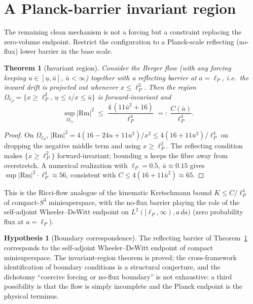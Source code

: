 \documentclass[aps,prd,twocolumn,superscriptaddress,nofootinbib,floatfix]{revtex4-2}
\theoremstyle{plain}
\newtheorem{theorem}{Theorem}
\theoremstyle{definition}
\newtheorem{hypothesis}{Hypothesis}
\newcommand{\Rm}{\mathrm{Rm}}
\newcommand{\lP}{\ell_P}
\begin{document}
\section{A Planck-barrier invariant region}\label{sec:barrier}

The remaining clean mechanism is not a forcing but a constraint replacing the zero-volume endpoint. Restrict the configuration to a Planck-scale reflecting (no-flux) lower barrier in the base scale.

\begin{theorem}[Invariant region]\label{thm:barrier}
Consider the Berger flow (with any forcing keeping $u\in[\underline u,\bar u]$, $\bar u<\infty$) together with a reflecting barrier at $a=\lP$, i.e.\ the inward drift is projected out whenever $x\le\lP^2$. Then the region $\Omega_{\lP}=\{x\ge\lP^2,\ \underline u\le z/x\le\bar u\}$ is forward-invariant and
\begin{equation}\label{eq:bound}
\sup_{\Omega_{\lP}}|\Rm|^2 \;\le\; \frac{4\,(11\bar u^2+16)}{\lP^4}\;=:\;\frac{C(\bar u)}{\lP^4}.
\end{equation}
\end{theorem}

\begin{proof}
On $\Omega_{\lP}$, $|\Rm|^2=4(16-24u+11u^2)/x^2\le 4(16+11\bar u^2)/\lP^4$ on dropping the negative middle term and using $x\ge\lP^2$. The reflecting condition makes $\{x\ge\lP^2\}$ forward-invariant; bounding $u$ keeps the fibre away from overstretch. A numerical realization with $\lP=0.5$, $\bar u\approx0.15$ gives $\sup|\Rm|^2\cdot\lP^4\approx56$, consistent with $C\le 4(16+11\bar u^2)\approx65$.
\end{proof}

This is the Ricci-flow analogue of the kinematic Kretschmann bound $K\le C/\lP^4$ of compact-$S^3$ minisuperspace, with the no-flux barrier playing the role of the self-adjoint Wheeler--DeWitt endpoint on $L^2([\lP,\infty),a\,da)$ (zero probability flux at $a=\lP$).

\begin{hypothesis}[Boundary correspondence]\label{hyp:wdw}
The reflecting barrier of Theorem~\ref{thm:barrier} corresponds to the self-adjoint Wheeler--DeWitt endpoint of compact minisuperspace. The invariant-region theorem is proved; the cross-framework identification of boundary conditions is a structural conjecture, and the dichotomy ``coercive forcing or no-flux boundary'' is not exhaustive: a third possibility is that the flow is simply incomplete and the Planck endpoint is the physical terminus.
\end{hypothesis}
\end{document}
